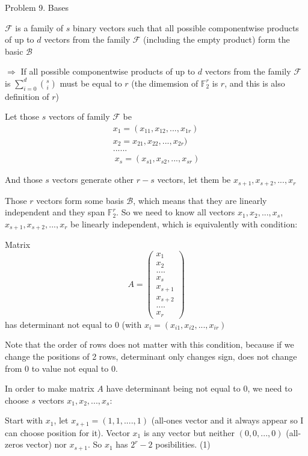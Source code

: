 \documentclass{article}
\begin{document}
Problem 9. Bases

$\mathcal{F}$ is a family of $s$ binary vectors such that all possible componentwise products of up to $d$ vectors from the family $\mathcal{F}$ (including the empty product) form the basic $\mathcal{B}$

$\Rightarrow$ If all possible componentwise products of up to $d$ vectors from the family $\mathcal{F}$ is $\sum_{i=0}^{d} \binom{s}{i}$ must be equal to $r$ (the dimemsion of $\mathbb{F}^r_2$ is $r$, and this is also definition of $r$)

Let those $s$ vectors of family $\mathcal{F}$ be
\begin{gather*}
    x_1 = (x_{11}, x_{12}, ..., x_{1r}) \\
    x_2 = x_{21}, x_{22}, ..., x_{2r}) \\
    ...... \\\
    x_s = (x_{s1}, x_{s2}, ..., x_{sr})
\end{gather*}

And those $s$ vectors generate other $r-s$ vectors, let them be $x_{s+1}, x_{s+2}, ..., x_{r}$

Those $r$ vectors form some basis $\mathcal{B}$, which means that they are linearly independent and they span $\mathbb{F}^r_2$. So we need to know all vectors $x_1, x_2, ..., x_s$, $x_{s+1}, x_{s+2}, ..., x_r$ be linearly independent, which is equivalently with condition:

Matrix $$A = \begin{pmatrix}
x_1 \\ x_2 \\ .... \\ x_s \\ x_{s+1} \\ x_{s+2} \\ .... \\ x_r
\end{pmatrix}$$ has determinant not equal to 0 (with $x_i = (x_{i1}, x_{i2}, ..., x_{ir})$

Note that the order of rows does not matter with this condition, because if we change the positions of 2 rows, determinant only changes sign, does not change from 0 to value not equal to 0.

In order to make matrix $A$ have determinant being not equal to 0, we need to choose $s$ vectors $x_1, x_2, ..., x_s$:

Start with $x_1$, let $x_{s+1} = (1,1,....,1)$ (all-ones vector and it always appear so I can choose position for it). Vector $x_1$ is any vector but neither $(0,0,...,0)$ (all-zeros vector) nor $x_{s+1}$. So $x_1$ has $2^r-2$ posibilities. (1)
\end{document}
